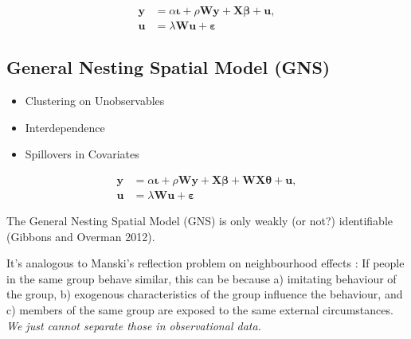 \documentclass[
  letterpaper,
  DIV=11,
  numbers=noendperiod]{scrreprt}
\providecommand{\tightlist}{%
  \setlength{\itemsep}{0pt}\setlength{\parskip}{0pt}}\usepackage{longtable,booktabs,array}
\begin{document}
\[
        \begin{equation}
        \begin{split}
        {\boldsymbol{\mathbf{y}}}&=\alpha{\boldsymbol{\mathbf{\iota}}}+\rho{\boldsymbol{\mathbf{W}}}{\boldsymbol{\mathbf{y}}}+{\boldsymbol{\mathbf{X}}}{\boldsymbol{\mathbf{\beta}}}+ {\boldsymbol{\mathbf{u}}},\\
        {\boldsymbol{\mathbf{u}}}&=\lambda{\boldsymbol{\mathbf{W}}}{\boldsymbol{\mathbf{u}}}+{\boldsymbol{\mathbf{\varepsilon}}}
        \end{split}
        \end{equation}
\]

\hypertarget{general-nesting-spatial-model-gns}{%
\subsection{General Nesting Spatial Model
(GNS)}\label{general-nesting-spatial-model-gns}}

\begin{itemize}
\tightlist
\item
  Clustering on Unobservables
\item
  Interdependence
\item
  Spillovers in Covariates
\end{itemize}

\[
        \begin{equation}
        \begin{split}
        {\boldsymbol{\mathbf{y}}}&=\alpha{\boldsymbol{\mathbf{\iota}}}+\rho{\boldsymbol{\mathbf{W}}}{\boldsymbol{\mathbf{y}}}+{\boldsymbol{\mathbf{X}}}{\boldsymbol{\mathbf{\beta}}}+{\boldsymbol{\mathbf{W}}}{\boldsymbol{\mathbf{X}}}{\boldsymbol{\mathbf{\theta}}}+ {\boldsymbol{\mathbf{u}}},\\
        {\boldsymbol{\mathbf{u}}}&=\lambda{\boldsymbol{\mathbf{W}}}{\boldsymbol{\mathbf{u}}}+{\boldsymbol{\mathbf{\varepsilon}}}
        \end{split}
        \end{equation}
\]

\begin{tcolorbox}[enhanced jigsaw, opacitybacktitle=0.6, left=2mm, leftrule=.75mm, toptitle=1mm, breakable, colback=white, bottomrule=.15mm, colframe=quarto-callout-tip-color-frame, colbacktitle=quarto-callout-tip-color!10!white, coltitle=black, bottomtitle=1mm, titlerule=0mm, title=\textcolor{quarto-callout-tip-color}{\faLightbulb}\hspace{0.5em}{Manski's reflection problem}, opacityback=0, arc=.35mm, rightrule=.15mm, toprule=.15mm]

The General Nesting Spatial Model (GNS) is only weakly (or not?)
identifiable (Gibbons and Overman 2012).

It's analogous to Manski's reflection problem on neighbourhood effects
\citep{Manski.1993.0}: If people in the same group behave similar, this
can be because a) imitating behaviour of the group, b) exogenous
characteristics of the group influence the behaviour, and c) members of
the same group are exposed to the same external circumstances. \emph{We
just cannot separate those in observational data.}

\end{tcolorbox}
\end{document}
